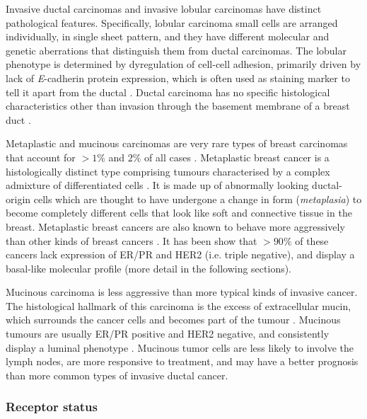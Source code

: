    Invasive ductal carcinomas and invasive lobular carcinomas have distinct pathological features. Specifically, lobular carcinoma small cells are arranged individually, in single sheet pattern, and they have different molecular and genetic aberrations that distinguish them from ductal carcinomas. The lobular phenotype is determined by dyregulation of cell-cell adhesion, primarily driven by lack of \textit{E}-cadherin protein expression, which is often used as staining marker to tell it apart from the ductal \cite{Ciriello2015ComprehensiveCancer}. Ductal carcinoma has no specific histological characteristics other than invasion through the basement membrane of a breast duct \cite{Weigelt2008RefinementTypes}. 
   
    Metaplastic and mucinous carcinomas are very rare types of breast carcinomas that account for $>1\%$ and $2\%$ of all cases  \cite{Makki2015DiversityRelevance}. 
    Metaplastic breast cancer is a histologically distinct type comprising tumours characterised by a complex admixture of differentiated cells  \cite{Makki2015DiversityRelevance}. It is made up of abnormally looking ductal-origin cells which are thought to have undergone a change in form (\textit{metaplasia}) to become completely different cells that look like soft and connective tissue in the breast. Metaplastic breast cancers are also known to  behave more aggressively than other kinds of breast cancers \cite{schwartz2013metaplastic}. 
    It has been show that $>90\%$ of these cancers lack expression of ER/PR and HER2 (i.e. triple negative), and display a basal-like molecular profile \cite{Weigelt2010a} (more detail in the following sections).


    Mucinous carcinoma is less aggressive than more typical kinds of invasive cancer. The histological hallmark of this carcinoma is the excess of extracellular mucin, which surrounds the cancer cells and becomes part of the tumour \cite{dumitru2015mucinous}.  Mucinous tumours are usually ER/PR positive and HER2 negative, and consistently display a luminal phenotype \cite{Weigelt2010a}. 
    Mucinous tumor cells are less likely to involve the lymph nodes, are more responsive to treatment, and may have a better prognosis than more common types of invasive ductal cancer.

   
   
   
   
   \subsubsection{Receptor status}
            
